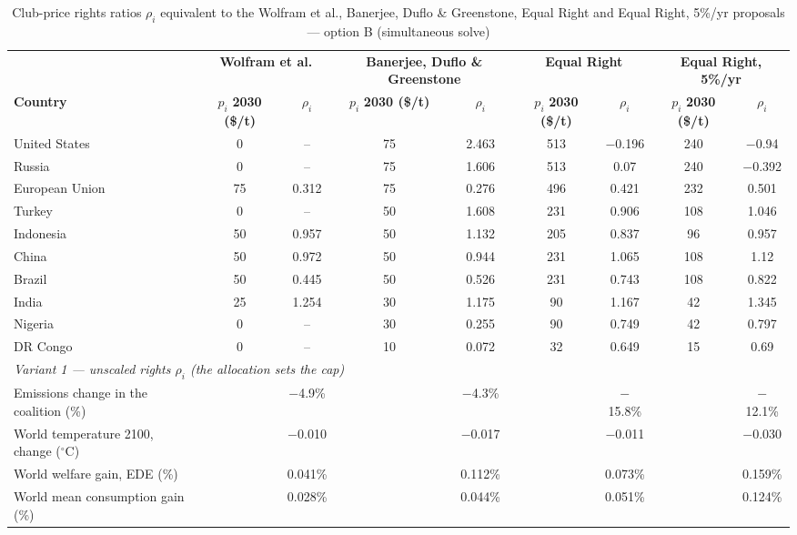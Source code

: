 \begin{table}[htbp]
\centering
\small
\caption{Club-price rights ratios $\rho_i$ equivalent to the Wolfram et al., Banerjee, Duflo \& Greenstone, Equal Right and Equal Right, 5\%/yr proposals --- option B (simultaneous solve)}
\renewcommand{\arraystretch}{1.15}
\begin{tabular}{lcccccccc}
  \toprule
  & \multicolumn{2}{c}{\textbf{Wolfram et al.}} & \multicolumn{2}{c}{\textbf{Banerjee, Duflo \& Greenstone}} & \multicolumn{2}{c}{\textbf{Equal Right}} & \multicolumn{2}{c}{\textbf{Equal Right, 5\%/yr}} \\
  \cmidrule(lr){2-3} \cmidrule(lr){4-5} \cmidrule(lr){6-7} \cmidrule(lr){8-9}
  \textbf{Country} & $p_i$ \textbf{2030 (\$/t)} & $\rho_i$ & $p_i$ \textbf{2030 (\$/t)} & $\rho_i$ & $p_i$ \textbf{2030 (\$/t)} & $\rho_i$ & $p_i$ \textbf{2030 (\$/t)} & $\rho_i$ \\
  \midrule
  United States & 0 & -- & 75 & 2.463 & 513 & $-$0.196 & 240 & $-$0.94 \\
  Russia & 0 & -- & 75 & 1.606 & 513 & 0.07 & 240 & $-$0.392 \\
  European Union & 75 & 0.312 & 75 & 0.276 & 496 & 0.421 & 232 & 0.501 \\
  Turkey & 0 & -- & 50 & 1.608 & 231 & 0.906 & 108 & 1.046 \\
  Indonesia & 50 & 0.957 & 50 & 1.132 & 205 & 0.837 & 96 & 0.957 \\
  China & 50 & 0.972 & 50 & 0.944 & 231 & 1.065 & 108 & 1.12 \\
  Brazil & 50 & 0.445 & 50 & 0.526 & 231 & 0.743 & 108 & 0.822 \\
  India & 25 & 1.254 & 30 & 1.175 & 90 & 1.167 & 42 & 1.345 \\
  Nigeria & 0 & -- & 30 & 0.255 & 90 & 0.749 & 42 & 0.797 \\
  DR Congo & 0 & -- & 10 & 0.072 & 32 & 0.649 & 15 & 0.69 \\
  \midrule
  \multicolumn{9}{l}{\textit{Variant 1 --- unscaled rights $\rho_i$ (the allocation sets the cap)}} \\
  \quad Emissions change in the coalition (\%) &  & $-$4.9\% &  & $-$4.3\% &  & $-$15.8\% &  & $-$12.1\% \\
  \quad World temperature 2100, change ($^\circ$C) &  & $-$0.010 &  & $-$0.017 &  & $-$0.011 &  & $-$0.030 \\
  \quad World welfare gain, EDE (\%) &  & 0.041\% &  & 0.112\% &  & 0.073\% &  & 0.159\% \\
  \quad World mean consumption gain (\%) &  & 0.028\% &  & 0.044\% &  & 0.051\% &  & 0.124\% \\

\end{tabular}
\end{table}
